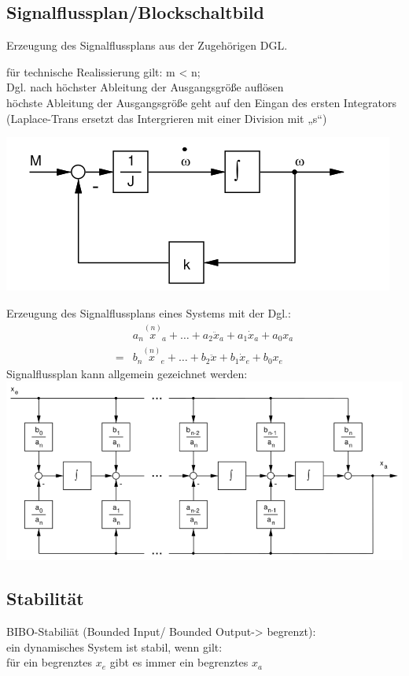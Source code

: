\documentclass[10pt,a4paper]{article}
\begin{document}
\subsection{Signalflussplan/Blockschaltbild}
    Erzeugung des Signalflussplans aus der Zugehörigen DGL.
    \begin{mdframed}[style=exercise]
        \begin{enumerate}
                für technische Realissierung gilt: m < n;\\
                Dgl. nach höchster Ableitung der Ausgangsgröße auflösen\\
                höchste Ableitung der Ausgangsgröße geht auf den Eingan des ersten Integrators\\
                (Laplace-Trans ersetzt das Intergrieren mit einer Division mit „s“)\\
        \end{enumerate}
    \end{mdframed}
    \begin{center}
            \includegraphics[width=.30\textwidth]{Figures/Signalflussplan12.png}
        \end{center}
        Erzeugung des Signalflussplans eines Systems mit der Dgl.:
        \begin{align*}
            &a_{n} \overset{(n)}{x}_{a}+\ldots+a_{2} \ddot{x}_{a}+a_{1} \dot{x}_{a}+a_{0} x_{a}\\
            = &b_{n} \overset{(n)}{x}_{e}+\ldots+b_{2} \ddot{x}+b_{1} \dot{x}_{e}+b_{0} x_{e}
        \end{align*}
                Signalflussplan kann allgemein gezeichnet werden:\\
        \includegraphics[width=.5\textwidth]{Figures/SFmitDGL.png}
\subsection{Stabilität}
    \begin{mdframed}[style=exercise]
    BIBO-Stabiliät (Bounded Input/ Bounded Output-> begrenzt):\\
    ein dynamisches System ist stabil, wenn gilt:\\
    für ein begrenztes $x_e$ gibt es immer ein begrenztes $x_a$
\end{mdframed}
\end{document}
